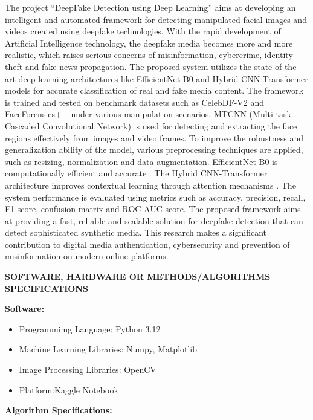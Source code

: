 \documentclass[12pt,a4paper]{report}
\begin{document}
The project “DeepFake Detection using Deep Learning” aims at developing an intelligent and automated framework for detecting manipulated facial images and videos created using deepfake technologies. With the rapid development of Artificial Intelligence technology, the deepfake media becomes more and more realistic, which raises serious concerns of misinformation, cybercrime, identity theft and fake news propagation. The proposed system utilizes the state of the art deep learning architectures like EfficientNet B0 and Hybrid CNN-Transformer models for accurate classification of real and fake media content. The framework is trained and tested on benchmark datasets such as CelebDF-V2 and FaceForensics++ under various manipulation scenarios. MTCNN (Multi-task Cascaded Convolutional Network) is used for detecting and extracting the face regions effectively from images and video frames. To improve the robustness and generalization ability of the model, various preprocessing techniques are applied, such as resizing, normalization and data augmentation. EfficientNet B0 is computationally efficient and accurate . The Hybrid CNN-Transformer architecture improves contextual learning through attention mechanisms . The system performance is evaluated using metrics such as accuracy, precision, recall, F1-score, confusion matrix and ROC-AUC score. The proposed framework aims at providing a fast, reliable and scalable solution for deepfake detection that can detect sophisticated synthetic media. This research makes a significant contribution to digital media authentication, cybersecurity and prevention of misinformation on modern online platforms.

\vspace{0.5cm}
\textbf{SOFTWARE, HARDWARE OR METHODS/ALGORITHMS SPECIFICATIONS}

\vspace{0.5cm}

\textbf{Software:}

\begin{itemize}
\item Programmimg Language: Python 3.12
\item Machine Learning Libraries: Numpy, Matplotlib
\item Image Processing Libraries: OpenCV
\item Platform:Kaggle Notebook
\end{itemize}

\vspace{0.5cm}

\textbf{Algorithm Specifications:}
\end{document}
